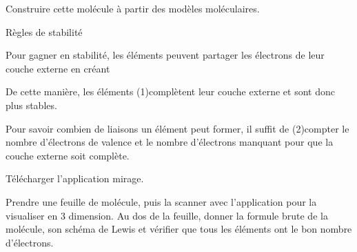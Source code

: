 \mesure
Construire cette molécule à partir des modèles moléculaires.

\begin{doc}{Règles de stabilité}
  \begin{importants}
    Pour gagner en stabilité, les éléments peuvent partager les électrons de leur couche externe en créant 
    
    De cette manière, les éléments \texteTrou(1){complètent leur couche externe et sont donc plus stables.}
    
    Pour savoir combien de liaisons un élément peut former, il suffit de
    \texteTrou(2){compter le nombre d'électrons de valence et le nombre d'électrons manquant pour que la couche externe soit complète.}
  \end{importants}
\end{doc}


\telechargement Télécharger l'application mirage.

\mesure Prendre une feuille de molécule, puis la scanner avec l'application pour la visualiser en 3 dimension.
Au dos de la feuille, donner la formule brute de la molécule, son schéma de Lewis et vérifier que tous les éléments ont le bon nombre d'électrons.